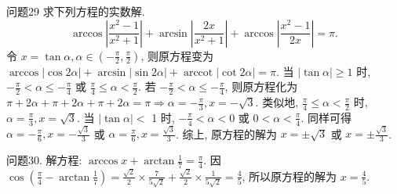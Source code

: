 问题29 求下列方程的实数解.
$$
\arccos \left|\frac{x^2-1}{x^2+1}\right|+\arcsin \left|\frac{2 x}{x^2+1}\right|+\arccos \left|\frac{x^2-1}{2 x}\right|=\pi .
$$
令 $x=\tan \alpha, \alpha \in\left(-\frac{\pi}{2}, \frac{\pi}{2}\right)$, 则原方程变为 $\arccos |\cos 2 \alpha|+ \arcsin |\sin 2 \alpha|+\operatorname{arccot}|\cot 2 \alpha|=\pi$. 当 $|\tan \alpha| \geqslant 1$ 时, $-\frac{\pi}{2}<\alpha \leqslant-\frac{\pi}{4}$ 或 $\frac{\pi}{4} \leqslant \alpha<\frac{\pi}{2}$. 若 $-\frac{\pi}{2}<\alpha \leqslant-\frac{\pi}{4}$, 则原方程化为 $\pi+2 \alpha+\pi+2 \alpha+\pi+2 \alpha= \pi \Rightarrow \alpha=-\frac{\pi}{3}, x=-\sqrt{3}$. 类似地, $\frac{\pi}{4} \leqslant \alpha<\frac{\pi}{2}$ 时, $\alpha=\frac{\pi}{3}, x=\sqrt{3}$. 当 $|\tan \alpha|<$ 1 时, $-\frac{\pi}{4}<\alpha<0$ 或 $0<\alpha<\frac{\pi}{4}$. 同样可得 $\alpha=-\frac{\pi}{6}, x=-\frac{\sqrt{3}}{3}$ 或 $\alpha=\frac{\pi}{6}, x= \frac{\sqrt{3}}{3}$. 综上, 原方程的解为 $x= \pm \sqrt{3}$ 或 $x= \pm \frac{\sqrt{3}}{3}$.



问题30. 解方程: $\arccos x+\arctan \frac{1}{7}=\frac{\pi}{4}$.
因 $\cos \left(\frac{\pi}{4}-\arctan \frac{1}{7}\right)=\frac{\sqrt{2}}{2} \times \frac{7}{5 \sqrt{2}}+\frac{\sqrt{2}}{2} \times \frac{1}{5 \sqrt{2}}=\frac{4}{5}$, 所以原方程的解为 $x=\frac{4}{5}$.


